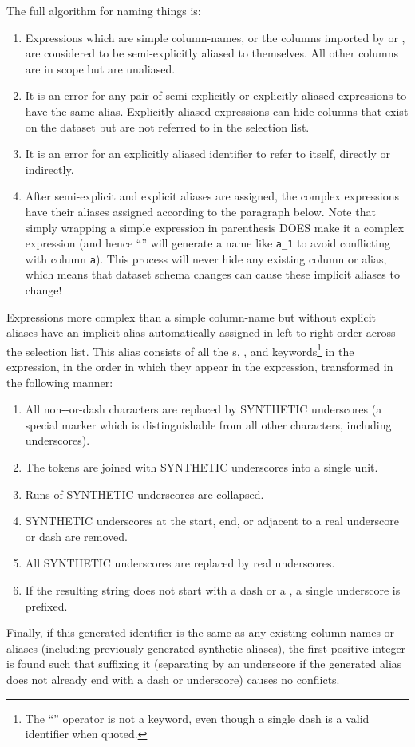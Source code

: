 \documentclass{article}
\begin{document}
The full algorithm for naming things is:
\begin{enumerate}
\item Expressions which are simple column-names, or the columns
  imported by \code{*} or \code{:*}, are considered to be
  semi-explicitly aliased to themselves.  All other columns are in
  scope but are unaliased.
\item It is an error for any pair of semi-explicitly or explicitly
  aliased expressions to have the same alias.  Explicitly aliased
  expressions can hide columns that exist on the dataset but are not
  referred to in the selection list.
\item It is an error for an explicitly aliased identifier to refer to
  itself, directly or indirectly.
\item After semi-explicit and explicit aliases are assigned, the
  complex expressions have their aliases assigned according to the
  paragraph below.  Note that simply wrapping a simple expression in
  parenthesis DOES make it a complex expression (and hence
  ``'' will generate a name like \lstinline|a_1| to avoid
  conflicting with column \lstinline|a|).  This process will never
  hide any existing column or alias, which means that dataset schema
  changes can cause these implicit aliases to change!
\end{enumerate}

Expressions more complex than a simple column-name but without
explicit aliases have an implicit alias automatically assigned in
left-to-right order across the selection list.  This alias consists of
all the s, , and keywords\footnote{The
  ``\code{-}'' operator is not a keyword, even though a single dash is
  a valid identifier when quoted.} in the expression, in the order in
which they appear in the expression, transformed in the following
manner:
\begin{enumerate}
\item All non--or-dash characters are
  replaced by SYNTHETIC underscores (a special marker which is
  distinguishable from all other characters, including underscores).
\item The tokens are joined with SYNTHETIC underscores into a single
  unit.
\item Runs of SYNTHETIC underscores are collapsed.
\item SYNTHETIC underscores at the start, end, or adjacent to a real
  underscore or dash are removed.
\item All SYNTHETIC underscores are replaced by real underscores.
\item If the resulting string does not start with a dash or a
  , a single underscore is prefixed.
\end{enumerate}
Finally, if this generated identifier is the same as any existing
column names or aliases (including previously generated synthetic
aliases), the first positive integer is found such that suffixing it
(separating by an underscore if the generated alias does not already
end with a dash or underscore) causes no conflicts.
\end{document}
